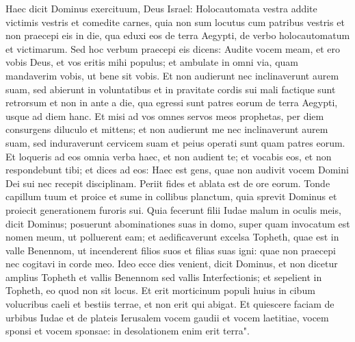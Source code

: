 \begin{biblechapter}
\verse Haec dicit Dominus exercituum, Deus Israel: Holocautomata vestra addite victimis vestris et comedite carnes, 
\verse quia non sum locutus cum patribus vestris et non praecepi eis in die, qua eduxi eos de terra Aegypti, de verbo holocautomatum et victimarum. 
\verse Sed hoc verbum praecepi eis dicens: Audite vocem meam, et ero vobis Deus, et vos eritis mihi populus; et ambulate in omni via, quam mandaverim vobis, ut bene sit vobis. 
\verse Et non audierunt nec inclinaverunt aurem suam, sed abierunt in voluntatibus et in pravitate cordis sui mali factique sunt retrorsum et non in ante 
\verse a die, qua egressi sunt patres eorum de terra Aegypti, usque ad diem hanc. Et misi ad vos omnes servos meos prophetas, per diem consurgens diluculo et mittens; 
\verse et non audierunt me nec inclinaverunt aurem suam, sed induraverunt cervicem suam et peius operati sunt quam patres eorum. 
\verse Et loqueris ad eos omnia verba haec, et non audient te; et vocabis eos, et non respondebunt tibi; 
\verse et dices ad eos: Haec est gens, quae non audivit vocem Domini Dei sui nec recepit disciplinam. Periit fides et ablata est de ore eorum. 
\verse Tonde capillum tuum et proice et sume in collibus planctum, quia sprevit Dominus et proiecit generationem furoris sui. 
\verse Quia fecerunt filii Iudae malum in oculis meis, dicit Dominus; posuerunt abominationes suas in domo, super quam invocatum est nomen meum, ut polluerent eam; 
\verse et aedificaverunt excelsa Topheth, quae est in valle Benennom, ut incenderent filios suos et filias suas igni: quae non praecepi nec cogitavi in corde meo. 
\verse Ideo ecce dies venient, dicit Dominus, et non dicetur amplius Topheth et vallis Benennom sed vallis Interfectionis; et sepelient in Topheth, eo quod non sit locus. 
\verse Et erit morticinum populi huius in cibum volucribus caeli et bestiis terrae, et non erit qui abigat. 
\verse Et quiescere faciam de urbibus Iudae et de plateis Ierusalem vocem gaudii et vocem laetitiae, vocem sponsi et vocem sponsae: in desolationem enim erit terra". 
\end{biblechapter}

